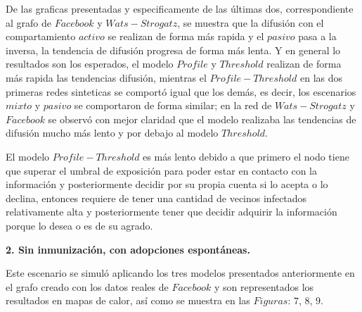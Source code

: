 \documentclass{article}
\begin{document}
De las graficas presentadas y especificamente de las últimas dos, correspondiente al grafo de $Facebook$ y $Wats-Strogatz$, se muestra que la difusión con el compartamiento $activo$ se realizan de forma más rapida y el $pasivo$ pasa a la inversa, la tendencia de difusión progresa de forma más lenta. Y en general lo resultados son los esperados, el modelo $Profile$ y $Threshold$ realizan de forma más rapida las tendencias difusión, mientras el $Profile-Threshold$ en las dos primeras redes sinteticas se comportó igual que los demás, es decir, los escenarios $mixto$ y $pasivo$ se comportaron de forma similar; en la red de $Wats-Strogatz$ y $Facebook$ se observó con mejor claridad que el modelo realizaba las tendencias de difusión mucho más lento y por debajo al modelo $Threshold$.

El modelo $Profile-Threshold$ es más lento debido a que primero el nodo tiene que superar el umbral de exposición para poder estar en contacto con la información y posteriormente decidir por su propia cuenta si lo acepta o lo declina, entonces requiere de tener una cantidad de vecinos infectados relativamente alta y posteriormente tener que decidir adquirir la información porque lo desea o es de su agrado. 

\newpage
\textbf{2. Sin inmunización, con adopciones espontáneas.}

Este escenario se simuló aplicando los tres modelos presentados anteriormente en el grafo creado con los datos reales de $Facebook$ y son representados los resultados en mapas de calor, así como se muestra en las $Figuras$: $7$, $8$, $9$. 
\end{document}
